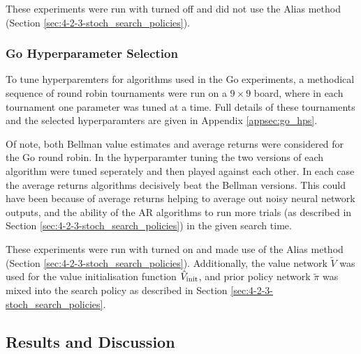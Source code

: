             These experiments were run with \mctsmode\ewe turned off and did not use the Alias method (Section \ref{sec:4-2-3-stoch_search_policies}).


            
        \subsubsection{Go Hyperparameter Selection}

            To tune hyperparemters for algorithms used in the Go experiments, a methodical sequence of round robin tournaments were run on a $9\times 9$ board, where in each tournament one parameter was tuned at a time. Full details of these tournaments and the selected hyperparamters are given in Appendix \ref{appsec:go_hps}.

            Of note, both Bellman value estimates and average returns were considered for the Go round robin. In the hyperparamter tuning the two versions of each algorithm were tuned seperately and then played against each other. In each case the average returns algorithms decisively beat the Bellman versions. This could have been because of average returns helping to average out noisy neural network outputs, and the ability of the AR algorithms to run more trials (as described in Section \ref{sec:4-2-3-stoch_search_policies}) in the given search time.
            
            These experiments were run with \mctsmode\ewe turned on and made use of the Alias method (Section \ref{sec:4-2-3-stoch_search_policies}). Additionally, the value network $\tilde{V}$ was used for the value initialisation function ${\hat{V}_{\textnormal{init}}}$, and prior policy network $\tilde{\pi}$ was mixed into the search policy as described in Section \ref{sec:4-2-3-stoch_search_policies}.

            





    \subsection{Results and Discussion}


